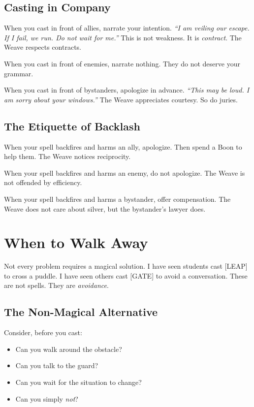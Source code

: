 \subsection{Casting in Company}

When you cast in front of allies, narrate your intention. \emph{``I am veiling our escape. If I fail, we run. Do not wait for me.''} This is not weakness. It is \emph{contract}. The Weave respects contracts.

When you cast in front of enemies, narrate nothing. They do not deserve your grammar.

When you cast in front of bystanders, apologize in advance. \emph{``This may be loud. I am sorry about your windows.''} The Weave appreciates courtesy. So do juries.

\subsection{The Etiquette of Backlash}

When your spell backfires and harms an ally, apologize. Then spend a Boon to help them. The Weave notices reciprocity.

When your spell backfires and harms an enemy, do not apologize. The Weave is not offended by efficiency.

When your spell backfires and harms a bystander, offer compensation. The Weave does not care about silver, but the bystander's lawyer does.

\section{When to Walk Away}

Not every problem requires a magical solution. I have seen students cast [LEAP] to cross a puddle. I have seen others cast [GATE] to avoid a conversation. These are not spells. They are \emph{avoidance}.

\subsection{The Non-Magical Alternative}

Consider, before you cast:

\begin{itemize}
    \item Can you walk around the obstacle?
    \item Can you talk to the guard?
    \item Can you wait for the situation to change?
    \item Can you simply \emph{not}?
\end{itemize}

